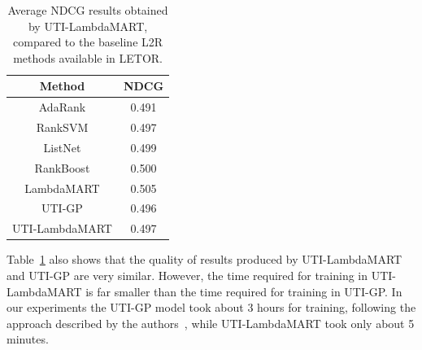 \documentclass[preprint,review,10pt,3p]{elsarticle}
\begin{document}
\begin{table}

\caption{Average NDCG results obtained by UTI-LambdaMART, compared to the baseline L2R methods available in LETOR.}

\label{tab:baseline}

\begin{center}

\begin{tabular}{|c|c|}

\hline

\textbf{Method} & \textbf{NDCG} \\

\hline\hline

AdaRank & 0.491 \\

\hline

RankSVM & 0.497 \\

\hline

ListNet & 0.499 \\

\hline

RankBoost & 0.500 \\

\hline

LambdaMART & 0.505 \\

\hline\hline

UTI-GP & 0.496\\

\hline

UTI-LambdaMART & 0.497 \\

\hline

\end{tabular}

\end{center}

\end{table}

Table~\ref{tab:baseline} also shows that the quality of results
produced by UTI-LambdaMART and UTI-GP are very similar. However, the
time required for training in UTI-LambdaMART is far smaller than
the time required for training in UTI-GP. In our
experiments the UTI-GP model took about 3 hours for training, following the approach described by the authors~\cite{costa2012lepref}, while UTI-LambdaMART took only
about 5 minutes.
\end{document}
